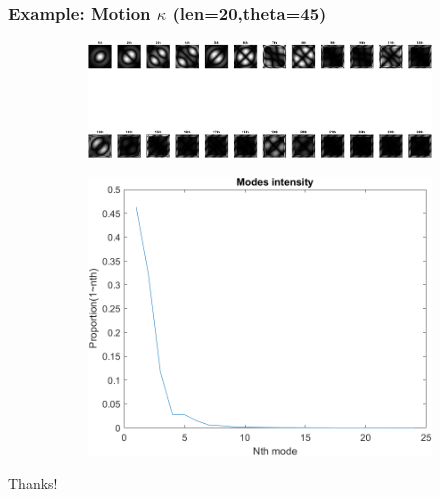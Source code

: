 \documentclass[UTF8]{beamer}
\begin{document}
\begin{frame} \frametitle{Example: Motion $\kappa$ (len=20,theta=45)}
\begin{figure}[H]
\centering
\begin{subfigure}{1\textwidth}
    \centering
    \includegraphics[width=0.8\linewidth]{../figures/ex_motion.png}  
    \label{fig:modes_u}
 \end{subfigure}
 \begin{subfigure}{1\textwidth}
    \centering
    \includegraphics[width=.4\linewidth]{../figures/ex_motion_s.png}  
    \label{fig:modes_u_phaze}
 \end{subfigure}
 \end{figure}
\end{frame}



%
\begin{frame} 

\centerline{\huge Thanks!}
\end{frame}
\end{document}
